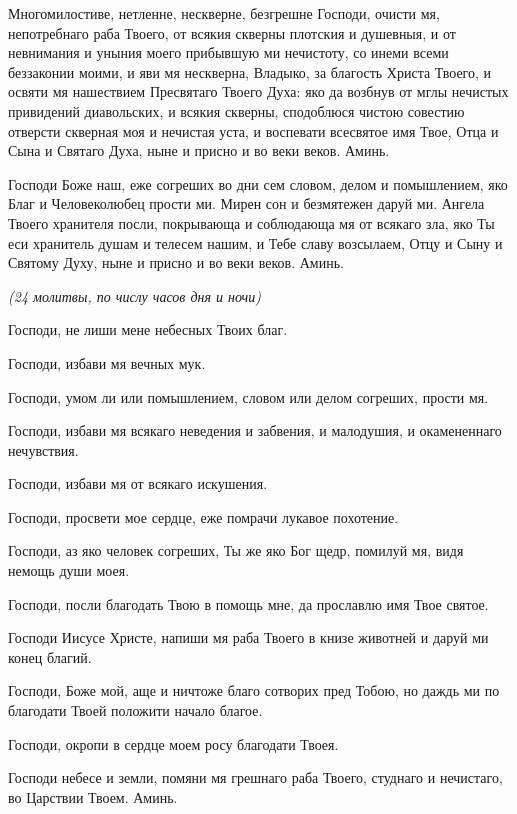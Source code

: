 

Многомилостиве, нетленне, нескверне, безгрешне Господи, очисти мя, непотребнаго раба Твоего, от всякия скверны плотския и душевныя, и от невнимания и уныния моего прибывшую ми нечистоту, со инеми всеми беззаконии моими, и яви мя нескверна, Владыко, за благость Христа Твоего, и освяти мя нашествием Пресвятаго Твоего Духа: яко да возбнув от мглы нечистых привидений диавольских, и всякия скверны, сподоблюся чистою совестию отверсти скверная моя и нечистая уста, и воспевати всесвятое имя Твое, Отца и Сына и Святаго Духа, ныне и присно и во веки веков. Аминь.




Господи Боже наш, еже согреших во дни сем словом, делом и помышлением, яко Благ и Человеколюбец прости ми. Мирен сон и безмятежен даруй ми. Ангела Твоего хранителя посли, покрывающа и соблюдающа мя от всякаго зла, яко Ты еси хранитель душам и телесем нашим, и Тебе славу возсылаем, Отцу и Сыну и Святому Духу, ныне и присно и во веки веков. Аминь.




\itshape (24 молитвы, по числу часов дня и ночи)\normalfont{}

Господи, не лиши мене небесных Твоих благ.

Господи, избави мя вечных мук.

Господи, умом ли или помышлением, словом или делом согреших, прости мя.

Господи, избави мя всякаго неведения и забвения, и малодушия, и окамененнаго нечувствия.

Господи, избави мя от всякаго искушения.

Господи, просвети мое сердце, еже помрачи лукавое похотение.

Господи, аз яко человек согреших, Ты же яко Бог щедр, помилуй мя, видя немощь души моея.

Господи, посли благодать Твою в помощь мне, да прославлю имя Твое святое.

Господи Иисусе Христе, напиши мя раба Твоего в книзе животней и даруй ми конец благий.

Господи, Боже мой, аще и ничтоже благо сотворих пред Тобою, но даждь ми по благодати Твоей положити начало благое.

Господи, окропи в сердце моем росу благодати Твоея.

Господи небесе и земли, помяни мя грешнаго раба Твоего, студнаго и нечистаго, во Царствии Твоем. Аминь.

